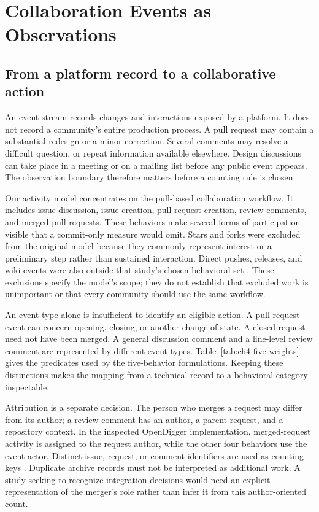 \section{Collaboration Events as Observations}
\label{sec:ch4-observations}

\subsection{From a platform record to a collaborative action}
An event stream records changes and interactions exposed by a platform. It does not record a community's entire production process. A pull request may contain a substantial redesign or a minor correction. Several comments may resolve a difficult question, or repeat information available elsewhere. Design discussions can take place in a meeting or on a mailing list before any public event appears. The observation boundary therefore matters before a counting rule is chosen.

Our activity model concentrates on the pull-based collaboration workflow. It includes issue discussion, issue creation, pull-request creation, review comments, and merged pull requests. These behaviors make several forms of participation visible that a commit-only measure would omit. Stars and forks were excluded from the original model because they commonly represent interest or a preliminary step rather than sustained interaction. Direct pushes, releases, and wiki events were also outside that study's chosen behavioral set \citep[Section IV.A]{xia2022}. These exclusions specify the model's scope; they do not establish that excluded work is unimportant or that every community should use the same workflow.

An event type alone is insufficient to identify an eligible action. A pull-request event can concern opening, closing, or another change of state. A closed request need not have been merged. A general discussion comment and a line-level review comment are represented by different event types. Table~\ref{tab:ch4-five-weights} gives the predicates used by the five-behavior formulations. Keeping these distinctions makes the mapping from a technical record to a behavioral category inspectable.

Attribution is a separate decision. The person who merges a request may differ from its author; a review comment has an author, a parent request, and a repository context. In the inspected OpenDigger implementation, merged-request activity is assigned to the request author, while the other four behaviors use the event actor. Distinct issue, request, or comment identifiers are used as counting keys \citep{diggercode2026}. Duplicate archive records must not be interpreted as additional work. A study seeking to recognize integration decisions would need an explicit representation of the merger's role rather than infer it from this author-oriented count.

